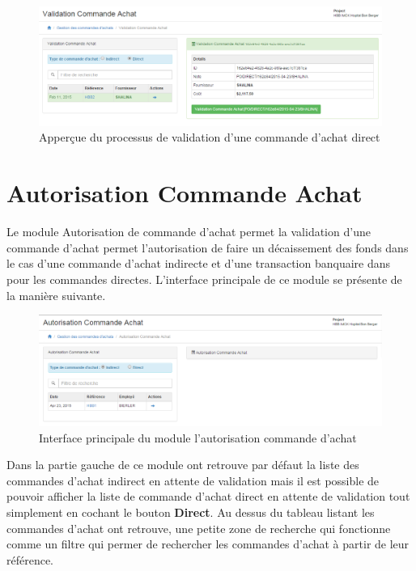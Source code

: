 \documentclass[12pt,a4paper]{report}
\begin{document}
\begin{figure}[h]
\begin{center}
\includegraphics[width=12cm]{pic/ValidAchatDirect.png}
\end{center}
\caption{Apperçue du processus de validation d'une commande d'achat direct}
\label{Apperçue du processus de validation d'une commande d'achat direct}
\end{figure} 


\newpage
\section{Autorisation Commande Achat}
Le module Autorisation de commande d'achat permet la validation d'une commande d'achat permet l'autorisation de faire un décaissement des fonds dans le cas d'une commande d'achat indirecte et d'une transaction banquaire dans pour les commandes directes. L'interface principale de ce module se présente de la manière suivante.

\begin{figure}[h]
\begin{center}
\includegraphics[width=12cm]{pic/AutorisAchat.png}
\end{center}
\caption{Interface principale du module l'autorisation commande d'achat}
\label{Interface principale du module l'autorisation commande d'achat}
\end{figure}  

Dans la partie gauche de ce module ont retrouve par défaut la liste des commandes d'achat indirect en attente de validation mais il est possible de pouvoir afficher la liste de commande d'achat direct en attente de validation tout simplement en cochant le bouton \textbf{Direct}. Au dessus du tableau listant les commandes d'achat ont retrouve, une petite zone de recherche qui fonctionne comme un filtre qui permer de rechercher les commandes d'achat à partir de leur référence.
\end{document}
